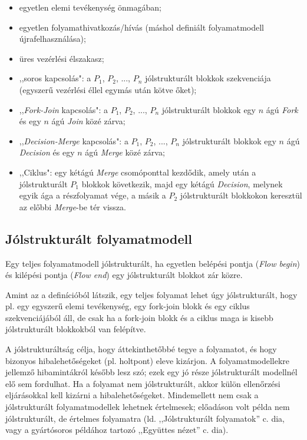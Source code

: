 \begin{itemize}
\item egyetlen elemi tevékenység önmagában;
\item egyetlen folyamathivatkozás/hívás (máshol definiált folyamatmodell újrafelhasználása);
\item üres vezérlési élszakasz;
\item ,,soros kapcsolás": a $P_1$, $P_2$, ..., $P_n$ jólstrukturált blokkok szekvenciája (egyszerű vezérlési éllel egymás után kötve őket);
\item ,,\emph{Fork-Join} kapcsolás": a $P_1$, $P_2$, ..., $P_n$ jólstrukturált blokkok egy $n$ ágú \emph{Fork} és egy $n$ ágú \emph{Join} közé zárva; 
\item ,,\emph{Decision-Merge} kapcsolás": a $P_1$, $P_2$, ..., $P_n$ jólstrukturált blokkok egy $n$ ágú \emph{Decision} és egy $n$ ágú \emph{Merge} közé zárva;
\item ,,Ciklus": egy kétágú \emph{Merge} csomóponttal kezdődik, amely után a jólstrukturált $P_1$ blokkok következik, majd egy kétágú \emph{Decision}, melynek egyik ága a részfolyamat vége, a másik a $P_2$ jólstrukturált blokkokon keresztül az előbbi \emph{Merge}-be tér vissza.
\end{itemize}

\subsection{Jólstrukturált folyamatmodell}

Egy teljes folyamatmodell jólstrukturált, ha egyetlen belépési pontja (\emph{Flow begin}) és kilépési pontja (\emph{Flow end}) egy jólstrukturált blokkot zár közre.

Amint az a definícióból látszik, egy teljes folyamat lehet úgy jólstrukturált, hogy pl. egy egyszerű elemi tevékenység, egy fork-join blokk és egy ciklus szekvenciájából áll, de csak ha a fork-join blokk és a ciklus maga is kisebb jólstrukturált blokkokból van felépítve.

A jólstrukturáltság célja, hogy áttekinthetőbbé tegye a folyamatot, és hogy bizonyos hibalehetőségeket (pl. holtpont) eleve kizárjon. A folyamatmodellekre jellemző hibamintákról később lesz szó; ezek egy jó része jólstrukturált modellnél elő sem fordulhat. Ha a folyamat nem jólstrukturált, akkor külön ellenőrzési eljárásokkal kell kizárni a hibalehetőségeket. Mindemellett nem csak a jólstrukturált folyamatmodellek lehetnek értelmesek; előadáson volt példa nem jólstrukturált, de értelmes folyamatra (ld. ,,Jólstrukturált folyamatok'' c. dia, vagy a gyártósoros példához tartozó ,,Együttes nézet'' c. dia).

